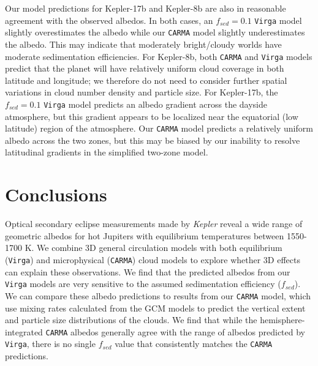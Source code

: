 \documentclass[twocolumn]{aastex63}
\begin{document}
Our model predictions for Kepler-17b and Kepler-8b are also in reasonable agreement with the observed albedos. In both cases, an $f_{sed}=0.1$ \texttt{Virga} model slightly overestimates the albedo while our \texttt{CARMA} model slightly underestimates the albedo. This may indicate that moderately bright/cloudy worlds have moderate sedimentation efficiencies.  For Kepler-8b, both \texttt{CARMA} and \texttt{Virga} models predict that the planet will have relatively uniform cloud coverage in both latitude and longitude; we therefore do not need to consider further spatial variations in cloud number density and particle size.  For Kepler-17b, the $f_{sed}=0.1$ \texttt{Virga} model predicts an albedo gradient across the dayside atmosphere, but this gradient appears to be localized near the equatorial (low latitude) region of the atmosphere.  Our \texttt{CARMA} model predicts a relatively uniform albedo across the two zones, but this may be biased by our inability to resolve latitudinal gradients in the simplified two-zone model.

\section{Conclusions}\label{sec:conclusions}

Optical secondary eclipse measurements made by \emph{Kepler} reveal a wide range of geometric albedos for hot Jupiters with equilibrium temperatures between 1550-1700 K. We combine 3D general circulation models with both equilibrium (\texttt{Virga}) and microphysical (\texttt{CARMA}) cloud models to explore whether 3D effects can explain these observations. We find that the predicted albedos from our \texttt{Virga} models are very sensitive to the assumed sedimentation efficiency ($f_{sed}$).  We can compare these albedo predictions to results from our \texttt{CARMA} model, which use mixing rates calculated from the GCM models to predict the vertical extent and particle size distributions of the clouds. We find that while the hemisphere-integrated \texttt{CARMA} albedos generally agree with the range of albedos predicted by \texttt{Virga}, there is no single $f_{sed}$ value that consistently matches the \texttt{CARMA} predictions. 
\end{document}
